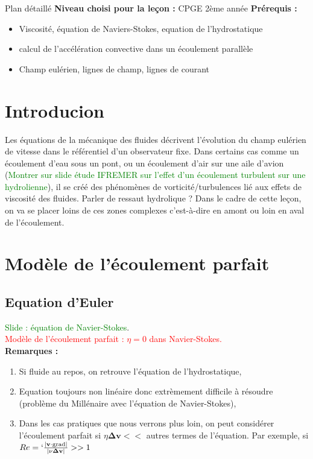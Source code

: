 \begin{reportBlock}{Plan détaillé}
  \textbf{Niveau choisi pour la leçon :} CPGE 2ème année
  \newline
  \textbf{Prérequis : }
  \begin{itemize}
      \item Viscosité, équation de Naviers-Stokes, equation de l'hydrostatique
      \item calcul de l'accélération convective dans un écoulement parallèle
      \item Champ eulérien, lignes de champ, lignes de courant
  \end{itemize}


\section*{Introducion}
Les équations de la mécanique des fluides décrivent l'évolution du champ eulérien de vitesse dans le référentiel d'un observateur fixe. Dans certains cas comme un écoulement d'eau sous un pont, ou un écoulement d'air sur une aile d'avion (\textcolor{green}{Montrer sur slide étude IFREMER sur l'effet d'un écoulement turbulent sur une hydrolienne}), il se créé des phénomènes de vorticité/turbulences lié aux effets de viscosité des fluides. Parler de ressaut hydrolique ? Dans le cadre de cette leçon, on va se placer loins de ces zones complexes c'est-à-dire en amont ou loin en aval de l'écoulement.

\section{Modèle de l'écoulement parfait}

\subsection{Equation d'Euler}
\textcolor{green}{Slide : équation de Navier-Stokes}.\\

\textcolor{red}{Modèle de l'écoulement parfait : $\eta=0$ dans Navier-Stokes.}\\
\textbf{Remarques :}
\begin{enumerate}
    \item Si fluide au repos, on retrouve l'équation de l'hydrostatique,
    \item Equation toujours non linéaire donc extrèmement difficile à résoudre (problème du Millénaire avec l'équation de Navier-Stokes),
    \item Dans les cas pratiques que nous verrons plus loin, on peut considérer l'écoulement parfait si $\eta\mathbf{\Delta v}<<$ autres termes de l'équation. Par exemple, si $Re = `\frac{\lvert \mathbf{v}\cdot\mathbf{\mathrm{grad}} \rvert}{\lvert \nu\mathbf{\Delta v}\rvert}>>1$
\end{enumerate}



\end{reportBlock}
